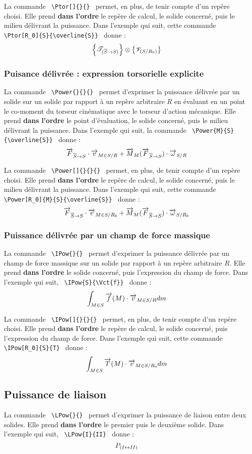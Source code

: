 \documentclass[12pt]{article}
\begin{document}
La commande \verb| \Ptor[]{}{} | permet, en plus, de tenir compte d'un repère choisi. Elle prend \textbf{dans l'ordre} le repère de calcul, le solide concerné, puis le milieu délivrant la puissance. Dans l'exemple qui suit, cette commande \verb| \Ptor[R_0]{S}{\overline{S}} | donne : $$\Ptor[R_0]{S}{\overline{S}}$$

\subsubsection{Puisance délivrée : expression torsorielle explicite}
La commande \verb| \Power{}{}{} | permet d'exprimer la puissance délivrée par un solide sur un solide par rapport à un repère arbitraire $R$ en évaluant en un point le co-moment du torseur cinématique avec le torseur d'action mécanique. Elle prend \textbf{dans l'ordre} le point d'évaluation, le solide concerné, puis le milieu délivrant la puissance. Dans l'exemple qui suit, la commande \verb| \Power{M}{S}{\overline{S}} | donne : $$\Power{M}{S}{\overline{S}}$$

La commande \verb| \Power[]{}{}{} | permet, en plus, de tenir compte d'un repère choisi. Elle prend \textbf{dans l'ordre} le repère de calcul, le solide concerné, puis le milieu délivrant la puissance. Dans l'exemple qui suit, cette commande \verb| \Power[R_0]{M}{S}{\overline{S}} | donne : $$\Power[R_0]{M}{S}{\overline{S}}$$

\subsubsection{Puissance délivrée par un champ de force massique}
La commande \verb| \IPow{}{} | permet d'exprimer la puissance délivrée par un champ de force massique sur un solide par rapport à un repère arbitraire $R$. Elle prend \textbf{dans l'ordre} le solide concerné, puis l'expression du champ de force. Dans l'exemple qui suit, \verb| \IPow{S}{\Vct{f}} | donne : $$\IPow{S}{f}$$

La commande \verb| \IPow[]{}{}{} | permet, en plus, de tenir compte d'un repère choisi. Elle prend \textbf{dans l'ordre} le repère de calcul, le solide concerné, puis l'expression du champ de force. Dans l'exemple qui suit, cette commande \verb| \IPow[R_0]{S}{T} | donne : $$\IPow[R_0]{S}{T}$$

\subsection{Puissance de liaison}
La commande \verb| \LPow{}{} | permet d'exprimer la puissance de liaison entre deux solides. Elle prend \textbf{dans l'ordre} le premier puis le deuxième solide. Dans l'exemple qui suit, \verb| \LPow{I}{II} | donne : $$\LPow{I}{II}$$
\end{document}
